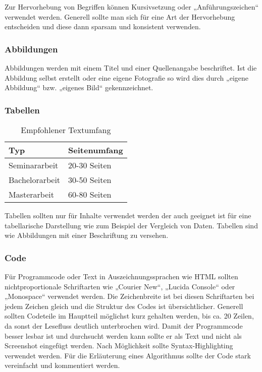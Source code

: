 Zur Hervorhebung von Begriffen können Kursivsetzung oder „Anführungszeichen“ verwendet werden. Generell sollte man sich für eine Art der Hervorhebung entscheiden und diese dann sparsam und  konsistent verwenden. 

\subsubsection{Abbildungen}\label{subsubsec:abbildungen}

Abbildungen werden mit einem Titel und einer Quellenangabe beschriftet. Ist die Abbildung selbst erstellt oder eine eigene Fotografie so wird dies durch „eigene Abbildung“ bzw. „eigenes Bild“ gekennzeichnet. 


\subsubsection{Tabellen}\label{subsubsec:tabellen}

{\renewcommand{\arraystretch}{1.5}
\begin{table}[h!]
\centering
\begin{tabular}{ l|l } 
\hline
    \textbf{Typ} & \textbf{Seitenumfang} \\
\hline
Seminararbeit & 20-30 Seiten \\
Bachelorarbeit & 30-50 Seiten \\
Masterarbeit & 60-80 Seiten \\
\hline
\end{tabular}
\caption{Empfohlener Textumfang}
\label{table:textumfang}
\end{table}}

Tabellen sollten nur für Inhalte verwendet werden der auch geeignet ist für eine tabellarische Darstellung wie zum Beispiel der Vergleich von Daten. Tabellen sind wie Abbildungen mit einer Beschriftung zu versehen.

\subsubsection{Code}\label{subsubsec:code}

Für Programmcode oder Text in Auszeichnungssprachen wie HTML sollten nichtproportionale Schriftarten wie „Courier New“, „Lucida Console“ oder „Monospace“ verwendet werden. Die Zeichenbreite ist bei diesen Schriftarten bei jedem Zeichen gleich und die Struktur des Codes ist übersichtlicher. Generell sollten Codeteile im Hauptteil möglichst kurz gehalten werden, bis ca. 20 Zeilen, da sonst der Lesefluss deutlich unterbrochen wird.  Damit der Programmcode besser lesbar ist und durchsucht werden kann sollte er als Text und nicht als Screenshot eingefügt werden. Nach Möglichkeit sollte Syntax-Highlighting verwendet werden. Für die  Erläuterung eines Algorithmus sollte der Code stark vereinfacht und kommentiert werden.



